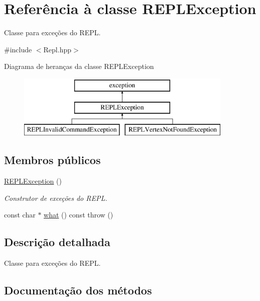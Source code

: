 \hypertarget{classREPLException}{}\section{Referência à classe R\+E\+P\+L\+Exception}
\label{classREPLException}


Classe para exceções do R\+E\+PL.  




{\ttfamily \#include $<$Repl.\+hpp$>$}

Diagrama de heranças da classe R\+E\+P\+L\+Exception\begin{figure}[H]
\begin{center}
\leavevmode
\includegraphics[height=3.000000cm]{classREPLException}
\end{center}
\end{figure}
\subsection*{Membros públicos}
\begin{DoxyCompactItemize}
\item 
\mbox{\label{classREPLException_abf6ea066b56e3730779929040b4f4762}} 
\mbox{\hyperlink{classREPLException_abf6ea066b56e3730779929040b4f4762}{R\+E\+P\+L\+Exception}} ()
\begin{DoxyCompactList}\small\item\em Construtor de exceções do R\+E\+PL. \end{DoxyCompactList}\item 
const char $\ast$ \mbox{\hyperlink{classREPLException_adf62c4f994bf3302c2e659899ae936fb}{what}} () const  throw ()
\end{DoxyCompactItemize}


\subsection{Descrição detalhada}
Classe para exceções do R\+E\+PL. 

\subsection{Documentação dos métodos}
\mbox{\label{classREPLException_adf62c4f994bf3302c2e659899ae936fb}} 
